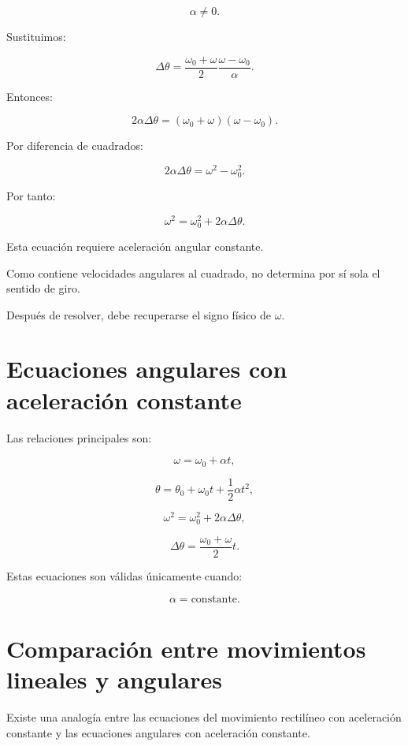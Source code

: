 \[
\alpha\neq0.
\]

Sustituimos:

\[
\Delta\theta
=
\frac{\omega_0+\omega}{2}
\frac{\omega-\omega_0}{\alpha}.
\]

Entonces:

\[
2\alpha\Delta\theta
=
(\omega_0+\omega)(\omega-\omega_0).
\]

Por diferencia de cuadrados:

\[
2\alpha\Delta\theta
=
\omega^2-\omega_0^2.
\]

Por tanto:

\[
\boxed{
\omega^2
=
\omega_0^2
+
2\alpha\Delta\theta
}.
\]

\begin{condicion}

Esta ecuación requiere aceleración angular constante.

Como contiene velocidades angulares al cuadrado, no determina por sí sola el
sentido de giro.

Después de resolver, debe recuperarse el signo físico de \(\omega\).

\end{condicion}


\section{Ecuaciones angulares con aceleración constante}

Las relaciones principales son:

\[
\boxed{
\omega=\omega_0+\alpha t
},
\]

\[
\boxed{
\theta
=
\theta_0+\omega_0t+\frac{1}{2}\alpha t^2
},
\]

\[
\boxed{
\omega^2
=
\omega_0^2+2\alpha\Delta\theta
},
\]

\[
\boxed{
\Delta\theta
=
\frac{\omega_0+\omega}{2}t
}.
\]

Estas ecuaciones son válidas únicamente cuando:

\[
\alpha=\text{constante}.
\]


\section{Comparación entre movimientos lineales y angulares}

Existe una analogía entre las ecuaciones del movimiento rectilíneo con
aceleración constante y las ecuaciones angulares con aceleración constante.

